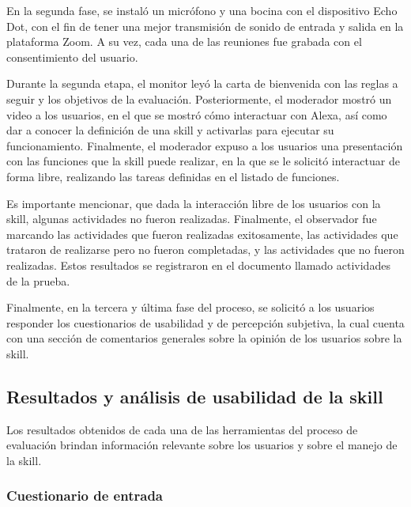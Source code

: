 En la segunda fase, se instaló un micrófono y una bocina con el dispositivo Echo Dot, con el fin de tener una mejor transmisión de sonido de entrada y salida en la plataforma Zoom. A su vez, cada una de las reuniones fue grabada con el consentimiento del usuario.

Durante la segunda etapa, el monitor leyó la carta de bienvenida con las reglas a seguir y los objetivos de la evaluación. Posteriormente, el moderador mostró un video a los usuarios, en el que se mostró cómo interactuar con Alexa, así como dar a conocer la definición de una skill y activarlas para ejecutar su funcionamiento. Finalmente, el moderador expuso a los usuarios una presentación con las funciones que la skill puede realizar, en la que se le solicitó interactuar de forma libre, realizando las tareas definidas en el listado de funciones.

Es importante mencionar, que dada la interacción libre de los usuarios con la skill, algunas actividades no fueron realizadas. Finalmente, el observador fue marcando las actividades que fueron realizadas exitosamente, las actividades que trataron de realizarse pero no fueron completadas, y las actividades que no fueron realizadas. Estos resultados se registraron en el documento llamado actividades de la prueba.

Finalmente, en la tercera y última fase del proceso, se solicitó a los usuarios responder los cuestionarios de usabilidad y de percepción subjetiva, la cual cuenta con una sección de comentarios generales sobre la opinión de los usuarios sobre la skill.


\subsection{Resultados y análisis de usabilidad de la skill}
\label{ResultadosAnalisisUsabilidadcapIV}

Los resultados obtenidos de cada una de las herramientas del proceso de evaluación brindan información relevante sobre los usuarios y sobre el manejo de la skill.


\subsubsection{Cuestionario de entrada}
\label{CuestionarioEntradacapIV}

